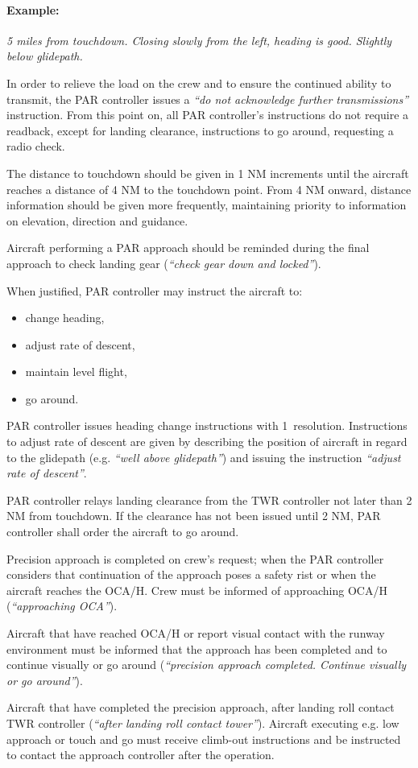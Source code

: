 \paragraph{Example:} \textit{5 miles from touchdown. Closing slowly from the left, heading is good. Slightly below glidepath.}

In order to relieve the load on the crew and to ensure the continued ability to transmit, the PAR controller issues a \textit{``do not acknowledge further transmissions''} instruction. From this point on, all PAR controller's instructions do not require a readback, except for landing clearance, instructions to go around, requesting a radio check.

The distance to touchdown should be given in 1 NM increments until the aircraft reaches a distance of 4 NM to the touchdown point. From 4 NM onward, distance information should be given more frequently, maintaining priority to information on elevation, direction and guidance.

Aircraft performing a PAR approach should be reminded during the final approach
to check landing gear (\textit{``check gear down and locked''}).

When justified, PAR controller may instruct the aircraft to:
\begin{itemize}
    \item change heading,
    \item adjust rate of descent,
    \item maintain level flight,
    \item go around.
\end{itemize}
PAR controller issues heading change instructions with 1\degree~resolution. Instructions to adjust rate of descent are given by describing the position of aircraft in regard to the glidepath (e.g. \emph{``well above glidepath''}) and issuing the instruction \emph{``adjust rate of descent''}.

PAR controller relays landing clearance from the TWR controller not later than 2 NM from touchdown. If the clearance has not been issued until 2 NM, PAR controller shall order the aircraft to go around.

Precision approach is completed on crew's request; when the PAR controller considers that continuation of the approach poses a safety rist or when the aircraft reaches the OCA/H. Crew must be informed of approaching OCA/H (\textit{``approaching OCA''}).

Aircraft that have reached OCA/H or report visual contact with the runway environment must be informed that the approach has been completed and to continue visually or go around (\textit{``precision approach completed. Continue visually or go around''}).

Aircraft that have completed the precision approach, after landing roll contact TWR controller (\textit{``after landing roll contact tower''}). Aircraft executing e.g. low approach or touch and go must receive climb-out instructions and be instructed to contact the approach controller after the operation.